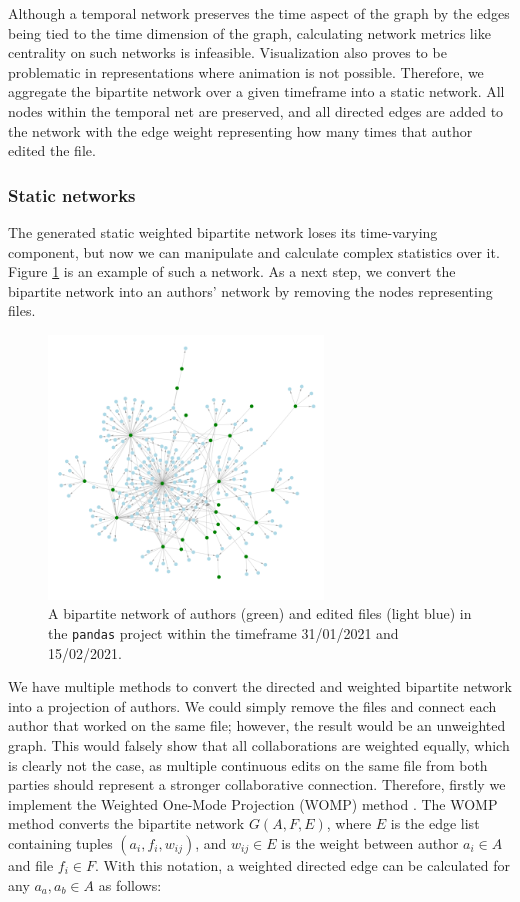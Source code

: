 Although a temporal network preserves the time aspect of the graph by the edges being tied to the time dimension of the graph, calculating network metrics like centrality on such networks is infeasible. Visualization also proves to be problematic in representations where animation is not possible. Therefore, we aggregate the bipartite network over a given timeframe into a static network. All nodes within the temporal net are preserved, and all directed edges are added to the network with the edge weight representing how many times that author edited the file.

\subsubsection{Static networks}
The generated static weighted bipartite network loses its time-varying component, but now we can manipulate and calculate complex statistics over it. Figure \ref{fig:bipartite} is an example of such a network. As a next step, we convert the bipartite network into an authors' network by removing the nodes representing files.

\begin{figure}[!htbp]
    \centering
    \includegraphics[width=0.65\textwidth]{figures/bipartite.png}
    \caption{A bipartite network of authors (green) and edited files (light blue) in the \texttt{pandas} project within the timeframe 31/01/2021 and 15/02/2021.}
    \label{fig:bipartite}
\end{figure}

We have multiple methods to convert the directed and weighted bipartite network into a projection of authors. We could simply remove the files and connect each author that worked on the same file; however, the result would be an unweighted graph. This would falsely show that all collaborations are weighted equally, which is clearly not the case, as multiple continuous edits on the same file from both parties should represent a stronger collaborative connection. Therefore, firstly we implement the Weighted One-Mode Projection (WOMP) method \cite{stramWeightedOneMode2017}. The WOMP method converts the bipartite network $G(A,F,E)$, where $E$ is the edge list containing tuples $(a_i,f_i,w_{ij})$, and $w_{ij} \in E$ is the weight between author $a_i \in A$ and file $f_i \in F$. With this notation, a weighted directed edge can be calculated for any $a_a, a_b \in A$ as follows:

